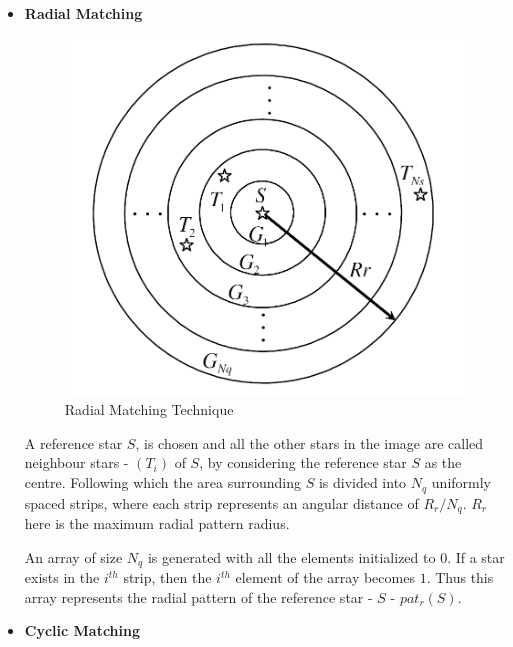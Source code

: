 \begin{itemize}
    \item \textbf{Radial Matching}
    
    \begin{figure}[!h]
        \centering
        \includegraphics[scale=0.35]{Figures/GNC/radial_technique.PNG}
        \caption{Radial Matching Technique}
        \label{fig:radial}
    \end{figure}
    
    A reference star $S$, is chosen and all the other stars in the image are called neighbour stars - $(T_i)$ of $S$, by considering the reference star $S$ as the centre. Following which the area surrounding $S$ is divided into $N_q$ uniformly spaced strips, where each strip represents an angular distance of $R_r/N_q$. $R_r$ here is the maximum radial pattern radius. 
    
    An array of size $N_q$ is generated with all the elements initialized to $0$. If a star exists in the $i^{th}$ strip, then the $i^{th}$ element of the array becomes $1$. Thus this array represents the radial pattern of the reference star - $S$ - $pat_r (S)$.
    
    \item \textbf{Cyclic Matching}
    

\end{itemize}
